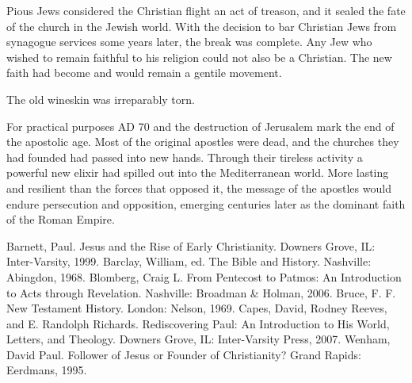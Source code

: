 Pious Jews considered the Christian flight an act of treason, and it sealed the fate of the church
in the Jewish world. With the decision to bar Christian Jews from synagogue services some years
later, the break was complete. Any Jew who wished to remain faithful to his religion could not also
be a Christian. The new faith had become and would remain a gentile movement.

The old wineskin was irreparably torn.

For practical purposes AD 70 and the destruction of Jerusalem mark the end of the apostolic age.
Most of the original apostles were dead, and the churches they had founded had passed into new
hands. Through their tireless activity a powerful new elixir had spilled out into the Mediterranean
world. More lasting and resilient than the forces that opposed it, the message of the apostles would
endure persecution and opposition, emerging centuries later as the dominant faith of the Roman
Empire.

\begin{readinglist}
\entry Barnett, Paul. Jesus and the Rise of Early Christianity. Downers Grove, IL: Inter-Varsity,
  1999.
\entry Barclay, William, ed. The Bible and History. Nashville: Abingdon, 1968.
\entry Blomberg, Craig L. From Pentecost to Patmos: An Introduction to Acts through Revelation.
  Nashville: Broadman \& Holman, 2006.
\entry Bruce, F. F. New Testament History. London: Nelson, 1969.
\entry *Capes, David, Rodney Reeves, and E. Randolph Richards. Rediscovering Paul: An Introduction
  to His World, Letters, and Theology. Downers Grove, IL: Inter-Varsity Press, 2007.
\entry Wenham, David Paul. Follower of Jesus or Founder of Christianity? Grand Rapids: Eerdmans,
  1995.
\end{readinglist}
